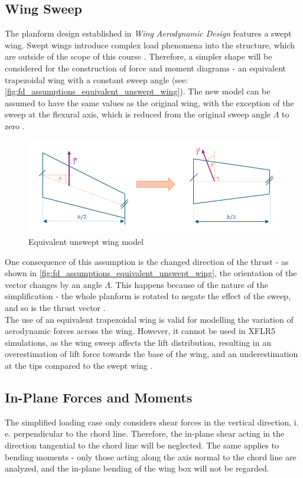 \subsection*{Wing Sweep}
The planform design established in \textit{Wing Aerodynamic Design} \cite{Koppejan2024WingDesign} features a swept wing. Swept wings introduce complex load phenomena into the structure, which are outside of the scope of this course \cite{Timmer2024AE2111-IReader}. Therefore, a simpler shape will be considered for the construction of force and moment diagrams - an equivalent trapezoidal wing with a constant sweep angle (see: \autoref{fig:fd_assumptions_equivalent_unswept_wing}). The new model can be assumed to have the same values as the original wing, with the exception of the sweep at the flexural axis, which is reduced from the original sweep angle $\Lambda$ to zero \cite{Timmer2024AE2111-IReader}.
\begin{figure}[h]
    \centering
    \includegraphics[width=0.85\linewidth]{figures/wing_sweep_effect.png}
    \caption{Equivalent unswept wing model}
    \label{fig:fd_assumptions_equivalent_unswept_wing}
\end{figure}

\noindent One consequence of this assumption is the changed direction of the thrust - as shown in \autoref{fig:fd_assumptions_equivalent_unswept_wing}, the orientation of the vector changes by an angle $\Lambda$. This happens because of the nature of the simplification - the whole planform is rotated to negate the effect of the sweep, and so is the thrust vector \cite{Timmer2024AE2111-IReader}.\\

\noindent The use of an equivalent trapezoidal wing is valid for modelling the variation of aerodynamic forces across the wing. However, it cannot be used in XFLR5 simulations, as the wing sweep affects the lift distribution, resulting in an overestimation of lift force towards the base of the wing, and an underestimation at the tips compared to the swept wing \cite{Timmer2024AE2111-IReader}.

\subsection*{In-Plane Forces and Moments}
The simplified loading case only considers shear forces in the vertical direction, i. e. perpendicular to the chord line. Therefore, the in-plane shear acting in the direction tangential to the chord line will be neglected. The same applies to bending moments - only those acting along the axis normal to the chord line are analyzed, and the in-plane bending of the wing box will not be regarded.\\

